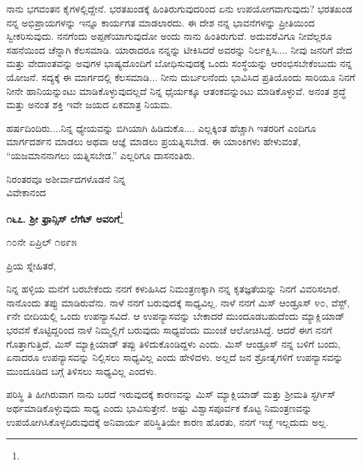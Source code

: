 ನಾನು ಭಗವಂತನ ಕೈಗಳಲ್ಲಿದ್ದೇನೆ. ಭರತಖಂಡಕ್ಕೆ ಹಿಂತಿರುಗುವುದರಿಂದ ಏನು ಉಪಯೋಗವಾಗುವುದು? ಭರತಖಂಡ ನನ್ನ ಅಭಿಪ್ರಾಯಗಳನ್ನು ಇನ್ನೂ ಕಾರ್ಯಗತ ಮಾಡಲಾರದು. ಈ ದೇಶ ನನ್ನ ಭಾವನೆಗಳನ್ನು ಪ್ರೀತಿಯಿಂದ ಸ್ವೀಕರಿಸುವುದು. ನನಗೆಂದು ಅಪ್ಪಣೆಯಾಗುವುದೋ ಅಂದು ನಾನು ಹಿಂತಿರುಗುವೆ. ಅದುವರೆವಿಗೂ ನೀವೆಲ್ಲರೂ ಸಹನೆಯಿಂದ ಚೆನ್ನಾಗಿ ಕೆಲಸಮಾಡಿ. ಯಾರಾದರೂ ನನ್ನನ್ನು ಟೀಕಿಸಿದರೆ ಅವರನ್ನು ನಿರ್ಲಕ್ಷಿಸಿ.... ನೀವು ಜನರಿಗೆ ವೇದ ಮತ್ತು ವೇದಾಂತವನ್ನು ಅವುಗಳ ಭಾಷ್ಯದೊಂದಿಗೆ ಬೋಧಿಸುವುದಕ್ಕೆ ಒಂದು ಸಂಸ್ಥೆಯನ್ನು ಆರಂಭಿಸಬೇಕೆಂಬುದು ನನ್ನ ಯೋಜನೆ. ಸದ್ಯಕ್ಕೆ ಈ ಮಾರ್ಗದಲ್ಲಿ ಕೆಲಸಮಾಡಿ... ನೀನು ದುರ್ಬಲನೆಂದು ಭಾವಿಸಿದ ಪ್ರತಿಯೊಂದು ಸಾರಿಯೂ ನಿನಗೆ ನೀನೇ ಹಾನಿಯನ್ನುಂಟು ಮಾಡಿಕೊಳ್ಳುವುದಲ್ಲದೆ ನಿನ್ನ ಧೈರ್ಯಕ್ಕೂ ಆತಂಕವನ್ನುಂಟು ಮಾಡಿಕೊಳ್ಳುವೆ. ಅನಂತ ಶ್ರದ್ಧೆ ಮತ್ತು ಅನಂತ ಶಕ್ತಿ ಇವೇ ಜಯದ ಏಕಮಾತ್ರ ನಿಯಮ.

ಹರ್ಷದಿಂದಿರು....ನಿನ್ನ ಧ್ಯೇಯವನ್ನು ಬಿಗಿಯಾಗಿ ಹಿಡಿದುಕೊ.... ಎಲ್ಲಕ್ಕಿಂತ ಹೆಚ್ಚಾಗಿ ಇತರರಿಗೆ ಎಂದಿಗೂ ಮಾರ್ಗದರ್ಶನ ಮಾಡಲು ಅಥವಾ ಆಜ್ಞೆ ಮಾಡಲು ಪ್ರಯತ್ನಿಸಬೇಡ. ಈ ಯಾಂಕಿಗಳು ಹೇಳುವಂತೆ, “ಯಜಮಾನನಾಗಲು ಯತ್ನಿಸಬೇಡ.” ಎಲ್ಲರಿಗೂ ದಾಸನಂತಿರು.

{\flushright
ನಿರಂತರವೂ ಅಶೀರ್ವಾದಗಳೊಡನೆ ನಿನ್ನ\\ವಿವೇಕಾನಂದ\par}

\begin{center}
\textbf{೧೬೭. ಶ‍್ರೀ ಫ್ರಾನ್ಸಿಸ್ ಲೆಗೆಟ್ ಅವರಿಗೆ}\footnote{}
\end{center}

\begin{flushright}
೧೦ನೇ ಏಪ್ರಿಲ್ ೧೮೯೫
\end{flushright}

\noindent
ಪ್ರಿಯ ಸ್ನೇಹಿತರೆ,
\vspace{0.3cm}

ನಿನ್ನ ಹಳ್ಳಿಯ ಮನೆಗೆ ಬರಬೇಕೆಂದು ನನಗೆ ಕಳುಹಿಸಿದ ನಿಮಂತ್ರಣಕ್ಕಾಗಿ ನನ್ನ ಕೃತಜ್ಞತೆಯನ್ನು ನಿನಗೆ ವಿವರಿಸಲಾರೆ. ನಾನೊಂದು ತಪ್ಪು ಮಾಡಿರುವೆನು. ನಾಳೆ ನನಗೆ ಬರುವುದಕ್ಕೆ ಸಾಧ್ಯವಿಲ್ಲ. ನಾಳೆ ನನಗೆ ಮಿಸ್ ಆಂಡ್ರೂಸ್ ೪೦, ವೆಸ್ಟ್, ೯ನೇ ಬೀದಿಯಲ್ಲಿ ಒಂದು ಉಪನ್ಯಾಸವಿದೆ. ಆ ಉಪನ್ಯಾಸವನ್ನು ಬೇಕಾದರೆ ಮುಂದೂಡಬಹುದೆಂದು ಮ್ಯಾಕ್ಲಿಯಾಡ್ ಭರವಸೆ ಕೊಟ್ಟಿದ್ದರಿಂದ ನಾಳೆ ನಿಮ್ಮಲ್ಲಿಗೆ ಬರುವುದು ಸಾಧ್ಯವೆಂದು ಮುಂಚೆ ಆಲೋಚಿಸಿದ್ದೆ. ಆದರೆ ಈಗ ನನಗೆ ಗೊತ್ತಾಗುತ್ತಿದೆ, ಮಿಸ್ ಮ್ಯಾಕ್ಲಿಯಾಡ್ ತಪ್ಪು ತಿಳಿದುಕೊಂಡಿದ್ದಳು ಎಂದು. ಮಿಸ್ ಆಂಡ್ರೂಸ್ ನನ್ನ ಬಳಿಗೆ ಬಂದು, ಏನಾದರೂ ಉಪನ್ಯಾಸವನ್ನು ನಿಲ್ಲಿಸಲು ಸಾಧ್ಯವಿಲ್ಲ ಎಂದು ಹೇಳಿದಳು. ಅಲ್ಲದೆ  ಜನ ಶ್ರೋತೃಗಳಿಗೆ ಉಪನ್ಯಾಸವನ್ನು ಮುಂದೂಡಿದ ಬಗ್ಗೆ ತಿಳಿಸಲು ಸಾಧ್ಯವಿಲ್ಲ ಎಂದಳು.
\vspace{0.3cm}

ಪರಿಸ್ಥಿ ತಿ ಹೀಗಿರುವಾಗ ನಾನು ಬರದೆ ಇರುವುದಕ್ಕೆ ಕಾರಣವನ್ನು ಮಿಸ್ ಮ್ಯಾಕ್ಲಿಯಾಡ್ ಮತ್ತು ಶ‍್ರೀಮತಿ ಸ್ಟರ್ಗಿಸ್ ಅರ್ಥಮಾಡಿಕೊಳ್ಳುವುದು ಸಾಧ್ಯ ಎಂದು ಭಾವಿಸುತ್ತೇನೆ. ಅಷ್ಟು ವಿಶ್ವಾಸಪೂರ್ವಕ ಕೊಟ್ಟ ನಿಮಂತ್ರಣವನ್ನು ಉಪಯೋಗಿಸಿಕೊಳ್ಳದಿರುವುದಕ್ಕೆ ಅನಿವಾರ್ಯ ಪರಿಸ್ಥಿತಿಯೇ ಕಾರಣ ಹೊರತು, ನನಗೆ ಇಚ್ಛೆ ಇಲ್ಲದುದು ಅಲ್ಲ.
\vspace{0.3cm}


